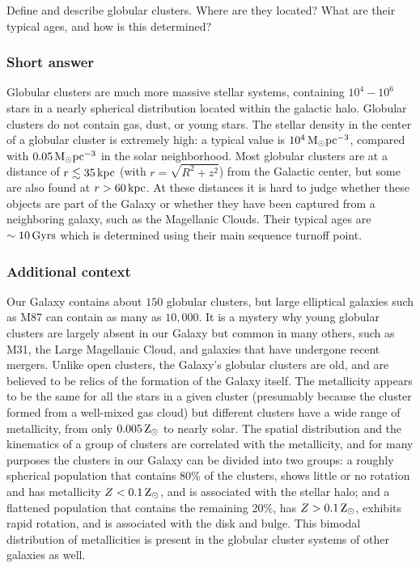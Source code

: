 \documentclass[a4paper,10pt]{article}
\begin{document}
Define and describe globular clusters. Where are they located? What are their typical ages, and how is this determined?

\subsubsection{Short answer}

Globular clusters are much more massive stellar systems, containing $10^4-10^6$ stars in a nearly spherical distribution located within the galactic halo. Globular clusters do not contain gas, dust, or young stars. The stellar density in the center of a globular cluster is extremely high: a typical value is $10^4\,{\rm M_\odot pc^{-3}}$, compared with $0.05\,{\rm M_\odot pc^{-3}}$ in the solar neighborhood. Most globular clusters are at a distance of $r\lesssim35\,{\rm kpc}$ (with $r=\sqrt{R^2+z^2}$) from the Galactic center, but some are also found at $r>60\,{\rm kpc}$. At these distances it is hard to judge whether these objects are part of the Galaxy or whether they have been captured from a neighboring galaxy, such as the Magellanic Clouds. Their typical ages are $\sim10\,{\rm Gyrs}$ which is determined using their main sequence turnoff point.

\subsubsection{Additional context}

Our Galaxy contains about $150$ globular clusters, but large elliptical galaxies such as M87 can contain as many as $10,000$. It is a mystery why young globular clusters are largely absent in our Galaxy but common in many others, such as M31, the Large Magellanic Cloud, and galaxies that have undergone recent mergers. Unlike open clusters, the Galaxy's globular clusters are old, and are believed to be relics of the formation of the Galaxy itself. The metallicity appears to be the same for all the stars in a given cluster (presumably because the cluster formed from a well-mixed gas cloud) but different clusters have a wide range of metallicity, from only $0.005\,{\rm Z_\odot}$ to nearly solar. The spatial distribution and the kinematics of a group of clusters are correlated with the metallicity, and for many purposes the clusters in our Galaxy can be divided into two groups: a roughly spherical population that contains 80\% of the clusters, shows little or no rotation and has metallicity $Z<0.1\,{\rm Z_\odot}$, and is associated with the stellar halo; and a flattened population that contains the remaining 20\%, has $Z>0.1\,{\rm Z_\odot}$, exhibits rapid rotation, and is associated with the disk and bulge. This bimodal distribution of metallicities is present in the globular cluster systems of other galaxies as well.
\end{document}
